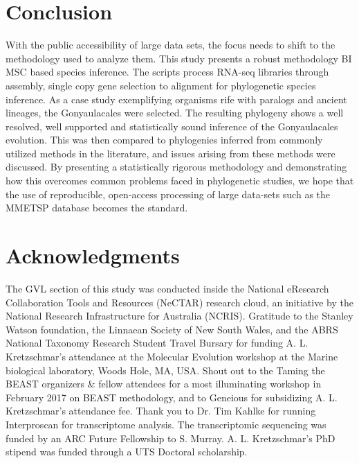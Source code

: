 \documentclass[12pt]{article}
\begin{document}
\newpage
\section{Conclusion}
With the public accessibility of large data sets, the focus needs to shift to the methodology used to analyze them. 
This study presents a robust methodology BI MSC based species inference. 
The scripts process RNA-seq libraries through assembly, single copy gene selection to alignment for phylogenetic species inference. 
As a case study exemplifying organisms rife with paralogs and ancient lineages, the Gonyaulacales were selected. 
The resulting phylogeny shows a well resolved, well supported and statistically sound inference of the Gonyaulacales evolution. 
This was then compared to phylogenies inferred from commonly utilized methods in the literature, and issues arising from these methods were discussed. 
By presenting a statistically rigorous methodology and demonstrating how this overcomes common problems faced in phylogenetic studies, we hope that the use of reproducible, open-access processing of large data-sets such as the MMETSP database becomes the standard.  
\newpage

\section{Acknowledgments}
The GVL section of this study was conducted inside the National eResearch Collaboration Tools and Resources (NeCTAR) research cloud, an initiative by the National Research Infrastructure for Australia (NCRIS).
Gratitude to the Stanley Watson foundation, the Linnaean Society of New South Wales, and the ABRS National Taxonomy Research Student Travel Bursary for funding A. L. Kretzschmar's attendance at the Molecular Evolution workshop at the Marine biological laboratory, Woods Hole, MA, USA.
Shout out to the Taming the BEAST organizers \& fellow attendees for a most illuminating workshop in February 2017 on BEAST methodology, and to Geneious for subsidizing A. L. Kretzschmar's attendance fee.
Thank you to Dr. Tim Kahlke for running Interproscan for transcriptome analysis. 
The transcriptomic sequencing was funded by  an ARC Future Fellowship to S. Murray.
A. L. Kretzschmar's PhD stipend was funded through a UTS Doctoral scholarship.
\end{document}
